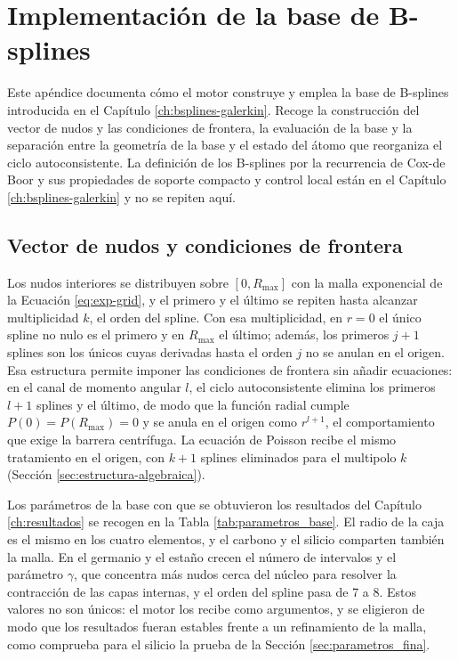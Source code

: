 \chapter{Implementación de la base de B-splines}
\label{ap:bsplines}

Este apéndice documenta cómo el motor construye y emplea la base de B-splines introducida en el Capítulo \ref{ch:bsplines-galerkin}. Recoge la construcción del vector de nudos y las condiciones de frontera, la evaluación de la base y la separación entre la geometría de la base y el estado del átomo que reorganiza el ciclo autoconsistente. La definición de los B-splines por la recurrencia de Cox-de Boor y sus propiedades de soporte compacto y control local están en el Capítulo \ref{ch:bsplines-galerkin} y no se repiten aquí.

\section{Vector de nudos y condiciones de frontera}

Los nudos interiores se distribuyen sobre $[0, R_{\text{max}}]$ con la malla exponencial de la Ecuación \eqref{eq:exp-grid}, y el primero y el último se repiten hasta alcanzar multiplicidad $k$, el orden del spline. Con esa multiplicidad, en $r = 0$ el único spline no nulo es el primero y en $R_{\text{max}}$ el último; además, los primeros $j+1$ splines son los únicos cuyas derivadas hasta el orden $j$ no se anulan en el origen. Esa estructura permite imponer las condiciones de frontera sin añadir ecuaciones: en el canal de momento angular $l$, el ciclo autoconsistente elimina los primeros $l+1$ splines y el último, de modo que la función radial cumple $P(0) = P(R_{\text{max}}) = 0$ y se anula en el origen como $r^{l+1}$, el comportamiento que exige la barrera centrífuga. La ecuación de Poisson recibe el mismo tratamiento en el origen, con $k+1$ splines eliminados para el multipolo $k$ (Sección \ref{sec:estructura-algebraica}).

Los parámetros de la base con que se obtuvieron los resultados del Capítulo \ref{ch:resultados} se recogen en la Tabla \ref{tab:parametros_base}. El radio de la caja es el mismo en los cuatro elementos, y el carbono y el silicio comparten también la malla. En el germanio y el estaño crecen el número de intervalos y el parámetro $\gamma$, que concentra más nudos cerca del núcleo para resolver la contracción de las capas internas, y el orden del spline pasa de 7 a 8. Estos valores no son únicos: el motor los recibe como argumentos, y se eligieron de modo que los resultados fueran estables frente a un refinamiento de la malla, como comprueba para el silicio la prueba de la Sección \ref{sec:parametros_fina}.


